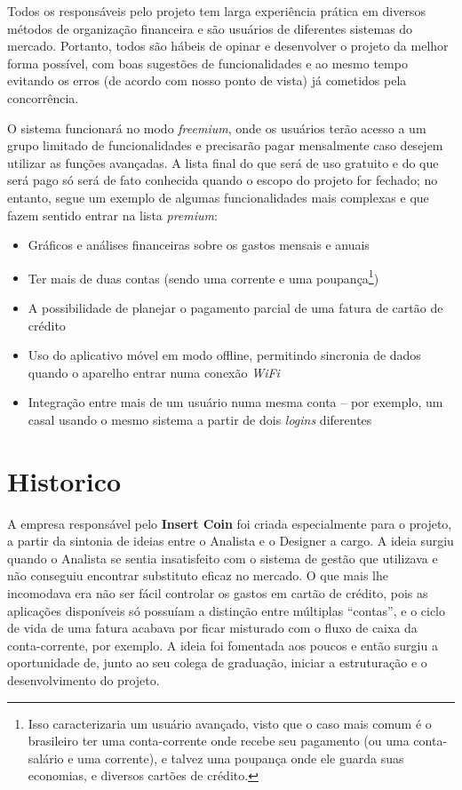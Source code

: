\documentclass[a4paper]{abnt}
\begin{document}
Todos os responsáveis pelo projeto tem larga experiência prática em diversos métodos de organização financeira e são usuários de diferentes sistemas do mercado. Portanto, todos são hábeis de opinar e desenvolver o projeto da melhor forma possível, com boas sugestões de funcionalidades e ao mesmo tempo evitando os erros (de acordo com nosso ponto de vista) já cometidos pela concorrência.

O sistema funcionará no modo \textit{freemium}, onde os usuários terão acesso a um grupo limitado de funcionalidades e precisarão pagar mensalmente caso desejem utilizar as funções avançadas. A lista final do que será de uso gratuito e do que será pago só será de fato conhecida quando o escopo do projeto for fechado; no entanto, segue um exemplo de algumas funcionalidades mais complexas e que fazem sentido entrar na lista \textit{premium}:
\begin{itemize}
	\item Gr\'aficos e an\'alises financeiras sobre os gastos mensais e anuais
	\item Ter mais de duas contas (sendo uma corrente e uma poupança\footnote{Isso caracterizaria um usu\'ario avançado, visto que o caso mais comum \'e o brasileiro ter uma conta-corrente onde recebe seu pagamento (ou uma conta-sal\'ario e uma corrente), e talvez uma poupança onde ele guarda suas economias, e diversos cart\~oes de cr\'edito.})
	\item A possibilidade de planejar o pagamento parcial de uma fatura de cart\~ao de cr\'edito
	\item Uso do aplicativo m\'ovel em modo offline, permitindo sincronia de dados quando o aparelho entrar numa conex\~ao \textit{WiFi}
	\item Integraç\~ao entre mais de um usu\'ario numa mesma conta -- por exemplo, um casal usando o mesmo sistema a partir de dois \textit{logins} diferentes
\end{itemize}
 
\section{Historico}
A empresa respons\'avel pelo \textbf{Insert Coin} foi criada especialmente para o projeto, a partir da sintonia de ideias entre o Analista e o Designer a cargo. A ideia surgiu quando o Analista se sentia insatisfeito com o sistema de gest\~ao que utilizava e n\~ao conseguiu encontrar substituto eficaz no mercado. O que mais lhe incomodava era n\~ao ser f\'acil controlar os gastos em cart\~ao de cr\'edito, pois as aplicações disponíveis só possuíam a distinção entre múltiplas ``contas'', e o ciclo de vida de uma fatura acabava por ficar misturado com o fluxo de caixa da conta-corrente, por exemplo. A ideia foi fomentada aos poucos e então surgiu a oportunidade de, junto ao seu colega de graduação, iniciar a estruturação e o desenvolvimento do projeto.
\end{document}
